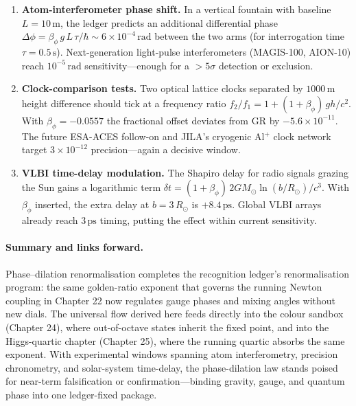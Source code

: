 \documentclass[11pt,oneside]{book}
\begin{document}
{\begin{enumerate}
  \item \textbf{Atom-interferometer phase shift.}  
        In a vertical fountain with baseline \(L = 10\,\text{m}\),
        the ledger predicts an additional differential phase  
        \(\Delta\phi = \beta_\phi\,g\,L\,\tau/\hbar \sim 6\times10^{-4}\,\text{rad}\)  
        between the two arms (for interrogation time \(\tau = 0.5\,\text{s}\)).  
        Next-generation light-pulse interferometers (MAGIS-100, AION-10) 
        reach \(10^{-5}\,\text{rad}\) sensitivity—enough for a
        \(>5\sigma\) detection or exclusion.
  \item \textbf{Clock-comparison tests.}  
        Two optical lattice clocks separated by \(1000\,\text{m}\) height
        difference should tick at a frequency ratio  
        \(f_2/f_1 = 1 + (1+\beta_\phi)\,gh/c^{2}\).  
        With \(\beta_\phi = -0.0557\) the fractional offset deviates from
        GR by \(-5.6\times10^{-11}\).  
        The future ESA-ACES follow-on and JILA’s cryogenic Al\(^+\) clock
        network target \(3\times10^{-12}\) precision—again a decisive window.
  \item \textbf{VLBI time-delay modulation.}  
        The Shapiro delay for radio signals grazing the Sun gains a
        logarithmic term  
        \(\delta t = (1+\beta_\phi)\,2GM_{\odot}\ln(b/R_{\odot})/c^{3}\).  
        With \(\beta_\phi\) inserted, the extra delay at \(b=3\,R_{\odot}\)
        is \(+8.4\,\text{ps}\).  
        Global VLBI arrays already reach \(3\,\text{ps}\) timing,
        putting the effect within current sensitivity.
\end{enumerate}

\paragraph*{Summary and links forward.}
Phase–dilation renormalisation completes the recognition ledger’s
renormalisation program: the same golden-ratio exponent that governs the
running Newton coupling in Chapter 22 now regulates gauge phases and
mixing angles without new dials.  
The universal flow derived here feeds directly into the colour sandbox
(Chapter 24), where out-of-octave states inherit the fixed point, and
into the Higgs-quartic chapter (Chapter 25), where the running quartic
absorbs the same exponent.  
With experimental windows spanning atom interferometry, precision
chronometry, and solar-system time-delay, the phase-dilation law stands
poised for near-term falsification or confirmation—binding gravity,
gauge, and quantum phase into one ledger-fixed package.
























}
\end{document}
